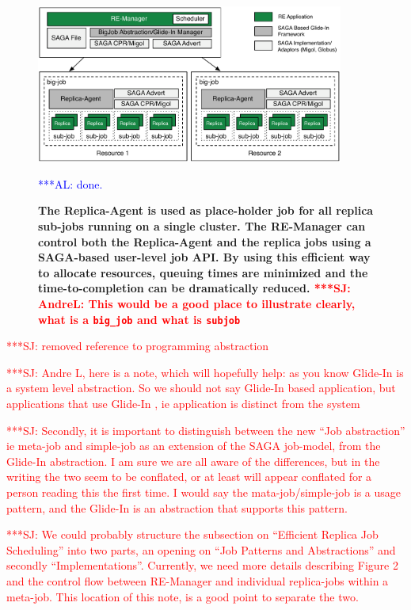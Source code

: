 \documentclass{rspublic}
\newcommand{\alnote}[1]{ {\textcolor{blue} { ***AL: #1 }}}
\newcommand{\jhanote}[1]{ {\textcolor{red} { ***SJ: #1 }}}
\newcommand{\alnote}[1]{}
\newcommand{\jhanote}[1]{}
\newcommand{\glidein}[1]{Glide-In }
\newcommand{\replicaagent}[1]{Replica-Agent }
\newcommand{\remanager}[1]{RE-Manager }
\begin{document}
\begin{figure}[t]
    \centering
    \includegraphics[width=0.9\textwidth]{remdmanager_v11}
    \caption{\footnotesize \bf The Replica-Agent is used as
      place-holder job for all replica sub-jobs running on a single
      cluster. The \remanager\ can control both the \replicaagent\ and
      the replica jobs using a SAGA-based user-level job API. By using
      this efficient way to allocate resources, queuing times are
      minimized and the time-to-completion can be dramatically
      reduced. \jhanote{AndreL: This would be a good place to
        illustrate clearly, what is a \texttt{big\_job} and 
        what is \texttt{sub\-job}}} \alnote{done.}
    \label{fig:remdmanager_v1.1}
\end{figure}

\jhanote{removed reference to programming abstraction}

\jhanote{Andre L, here is a note, which will hopefully help: as you
  know \glidein\ is a system level abstraction. So we should not say
  \glidein\ based application, but applications that use \glidein\ ,
  ie application is distinct from the system}

\jhanote{Secondly, it is important to distinguish between the new
  ``Job abstraction'' ie meta-job and simple-job as an extension of
  the SAGA job-model, from the \glidein\ abstraction. I am sure we are
  all aware of the differences, but in the writing the two seem to be
  conflated, or at least will appear conflated for a person reading
  this the first time. I would say the mata-job/simple-job is a usage
  pattern, and the \glidein\ is an abstraction that supports this
  pattern.}

\jhanote{We could probably structure the subsection on ``Efficient
  Replica Job Scheduling'' into two parts, an opening on ``Job
  Patterns and Abstractions'' and secondly
  ``Implementations''. Currently, we need more details describing
  Figure 2 and the control flow between \remanager\ and individual
  replica-jobs within a meta-job. This location of this note, is a
  good point to separate the two.}    
\end{document}
